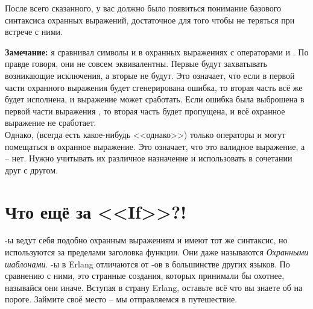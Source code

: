 После всего сказанного, у вас должно было появиться понимание базового синтаксиса охранных выражений, достаточное для того чтобы не теряться при встрече с ними.\\
\colorbox{lgray}
{
    \begin{minipage}{\linewidth}
        \textbf{Замечание:} я сравнивал символы \ops{,} и \ops{;} в охранных выражениях с операторами  и .
        По правде говоря, они не совсем эквивалентны.
        Первые будут захватывать возникающие исключения, а вторые не будут.
        Это означает, что если в первой части охранного выражения  будет сгенерирована ошибка, то вторая часть всё же будет исполнена, и выражение может сработать.
        Если ошибка была выброшена в первой части выражения , то вторая часть будет пропущена, и всё охранное выражение не сработает.\\ 
        Однако, (всегда есть какое\--нибудь <<однако>>) только операторы  и  могут помещаться в охранное выражение.
        Это означает, что  это валидное выражение, а  \--- нет.
        Нужно учитывать их различное назначение и использовать в сочетании друг с другом.
    \end{minipage}
}

\section{Что ещё за <<If>>?!}
\--ы ведут себя подобно охранным выражениям и имеют тот же синтаксис, но используются за пределами заголовка функции.
Они даже называются \emph{Охранными шаблонами}.
\--ы в Erlang отличаются от \--ов в большинстве других языков.
По сравнению с ними, это странные создания, которых принимали бы охотнее, называйся они иначе.
Вступая в страну Erlang, оставьте всё что вы знаете об  на пороге.
Займите своё место \--- мы отправляемся в путешествие.

